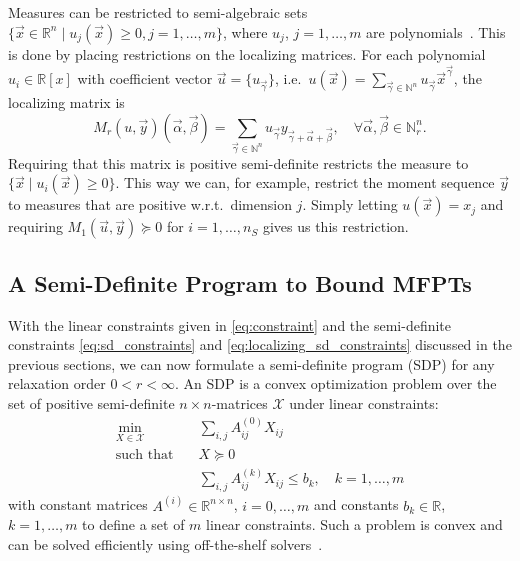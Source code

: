 Measures can be restricted to semi-algebraic sets
$\{\vec x\in\mathbb{R}^n \mid u_j(\vec x)\geq 0, j=1,\dots,m\}$,
where $u_j$, $j=1,\dots,m$ are polynomials~\cite{lasserre2010moments}.
This is done by placing restrictions on the {localizing matrices}.
For each polynomial $u_i\in\mathbb{R}[x]$ with coefficient vector
$\vec{u}=\{u_{\vec\gamma}\}$,
i.e.\ $u(\vec x) = \sum_{\vec{\gamma}\in\mathbb{N}^n} u_{\vec{\gamma}}
\vec{x}^{\vec{\gamma}}$,
the localizing matrix is
$$ M_r(u, \vec{y})(\vec{\alpha}, \vec{\beta})=
\sum_{\vec\gamma\in\mathbb{N}^n}u_{\vec\gamma}
y_{\vec\gamma+\vec\alpha+\vec\beta},\quad
\forall\vec{\alpha},\vec{\beta}\in\mathbb{N}^n_r.$$
Requiring that this matrix is positive semi-definite restricts the measure to
$\{\vec{x}\mid u_i(\vec{x})\geq 0\}$.
This way we can, for example, restrict the moment sequence $\vec{y}$
to measures that are positive w.r.t.\ dimension $j$.
Simply letting $u(\vec{x}) = x_j$ and requiring
$M_1(\vec{u},\vec{y})\succeq 0$ for $i=1,\dots,n_S$ gives us this restriction.


\subsection{A Semi-Definite Program to Bound MFPTs}
With the linear constraints given in \eqref{eq:constraint}
and the semi-definite constraints \eqref{eq:sd_constraints} and \eqref{eq:localizing_sd_constraints} 
discussed in the previous sections, we can now formulate a
semi-definite program (SDP) for any relaxation order $0<r<\infty$.
An SDP is a convex optimization problem over the set of positive semi-definite $n \times n$-matrices
$\mathcal{X}$ under linear constraints:
\begin{equation}
    \label{eq:sdp_canonical}
    \begin{split}
        \min_{X\in\mathcal{X}} \hspace{1em} & \sum_{i,j} A_{ij}^{(0)}X_{ij} \\
        \text{such that} \hspace{1em}
                 & X\succeq 0\\
            & \sum_{i,j} A_{ij}^{(k)}X_{ij} \leq b_k, \quad k=1,\dots,m
    \end{split}
\end{equation}
with constant matrices $A^{(i)}\in \mathbb{R}^{n\times n}$, $i=0,\dots,m$ and
constants $b_k\in\mathbb{R}$, $k=1,\dots,m$ to define a set of $m$ linear constraints.
Such a problem is convex and can be solved efficiently using off-the-shelf solvers~\cite{vandenberghe2010cvxopt}.

